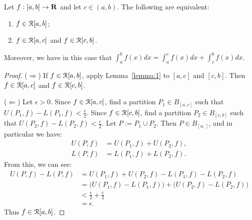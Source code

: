 \documentclass[10pt,twoside,openany]{memoir}
\begin{document}
    \begin{theorem}
        Let $f:[a,b] \rightarrow \mathbf{R}$ and let $c \in (a,b)$. The following are equivalent:
            \begin{enumerate}[label = (\arabic*),itemsep=1pt,topsep=3pt]
                \item $f \in \mathcal{R}[a,b]$;
                \item $f \in \mathcal{R}[a,c]$ and $f \in \mathcal{R}[c,b]$.
            \end{enumerate}
        Moreover, we have in this case that $\int_a^b f(x)dx = \int_a^c f(x)dx + \int_c^b f(x)dx$.
    \end{theorem}
        \begin{proof}
            ($\Rightarrow$) If $f \in \mathcal{R}[a,b]$, apply Lemma~\ref{lemma:1} to $[a,c]$ and $[c,b]$. Then $f \in \mathcal{R}[a,c]$ and $f \in \mathcal{R}[c,b]$.

            ($\Leftarrow$) Let $\epsilon > 0$. Since $f \in \mathcal{R}[a,c]$, find a partition $P_1 \in B_{[a,c]}$ such that $U(P_1,f) - L(P_1,f) < \frac{\epsilon}{2}$. Since $f \in \mathcal{R}[c,b]$, find a partition $P_2 \in B_{[c,b]}$ such that $U(P_2,f) - L(P_2,f) < \frac{\epsilon}{2}$. Let $P := P_1 \cup P_2$. Then $P \in B_{[a,]}$, and in particular we have:
                \begin{equation*}
                \begin{split}
                    U(P,f) &= U(P_1,f) + U(P_2,f), \\
                    L(P,f) &= L(P_1,f) + L(P_2,f).
                \end{split}
                \end{equation*}
            From this, we can see:
                \begin{equation*}
                \begin{split}
                    U(P,f) - L(P,f)
                    & = U(P_1,f) + U(P_2,f) -L(P_1,f) - L(P_2,f) \\
                    & = \bigl(U(P_1,f) -L(P_1,f) \bigr) + \bigl(U(P_2,f) -L(P_2,f) \bigr) \\
                    & < \frac{\epsilon}{2}  + \frac{\epsilon}{2} \\
                    & = \epsilon.
                \end{split}
                \end{equation*}
            Thus $f \in \mathcal{R}[a,b]$.


\end{proof}
\end{document}
